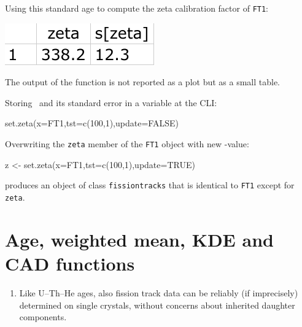 \begin{refsection}
Using this standard age to compute the zeta calibration factor of
\texttt{FT1}:\\

\noindent\begin{minipage}[t]{.2\linewidth}
\strut\vspace*{-\baselineskip}\newline
\includegraphics[width=\linewidth]{../figures/zetaoutput.png}\\
\end{minipage}
\begin{minipage}[t]{.8\linewidth}
The output of the function is not reported as a plot but as a small table.
\end{minipage}

Storing \textzeta~and its standard error in a variable at the CLI:

\begin{console}
set.zeta(x=FT1,tst=c(100,1),update=FALSE)
\end{console}

Overwriting the \texttt{zeta} member of the \texttt{FT1} object with
new \textzeta-value:

\begin{console}
z <- set.zeta(x=FT1,tst=c(100,1),update=TRUE)
\end{console}

\noindent produces an object of class \texttt{fissiontracks} that is
identical to \texttt{FT1} except for \texttt{zeta}.

\section{Age, weighted mean, KDE and CAD functions}

\begin{enumerate}

\item Like U--Th--He ages, also fission track data can be reliably (if
  imprecisely) determined on single crystals, without concerns about
  inherited daughter components.\\


\end{enumerate}
\end{refsection}
